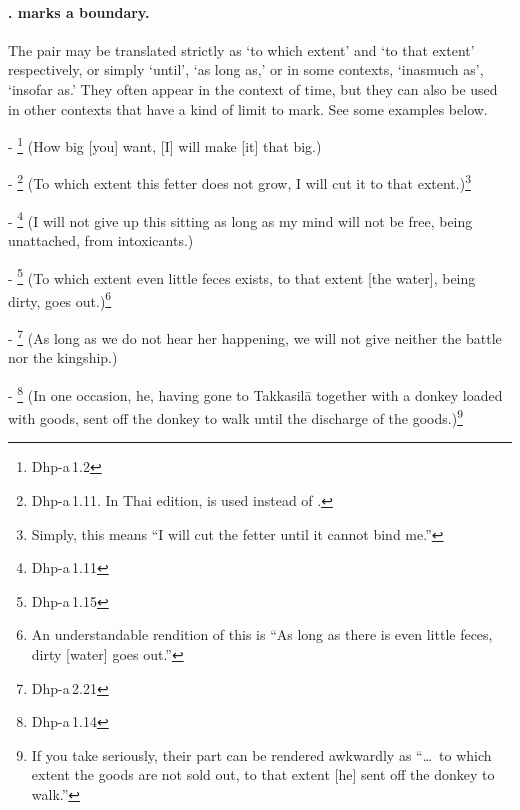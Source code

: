 \paragraph*{.  marks a boundary.} The pair may be translated strictly as `to which extent' and `to that extent' respectively, or simply `until', `as long as,' or in some contexts, `inasmuch as', `insofar as.' They often appear in the context of time, but they can also be used in other contexts that have a kind of limit to mark. See some examples below.\par
- \footnote{Dhp-a\,1.2} (How big [you] want, [I] will make [it] that big.)\par
- \footnote{Dhp-a\,1.11. In Thai edition,  is used instead of .} (To which extent this fetter does not grow, I will cut it to that extent.)\footnote{Simply, this means ``I will cut the fetter until it cannot bind me.''}\par
- \footnote{Dhp-a\,1.11} (I will not give up this sitting as long as my mind will not be free, being unattached, from intoxicants.)\par
- \footnote{Dhp-a\,1.15} (To which extent even little feces exists, to that extent [the water], being dirty, goes out.)\footnote{An understandable rendition of this is ``As long as there is even little feces, dirty [water] goes out.''}\par
- \footnote{Dhp-a\,2.21} (As long as we do not hear her happening, we will not give neither the battle nor the kingship.)\par
- \footnote{Dhp-a\,1.14} (In one occasion, he, having gone to Takkasil\=a together with a donkey loaded with goods, sent off the donkey to walk until the discharge of the goods.)\footnote{If you take  seriously, their part can be rendered awkwardly as ``\ldots\ to which extent the goods are not sold out, to that extent [he] sent off the donkey to walk.''}\par

